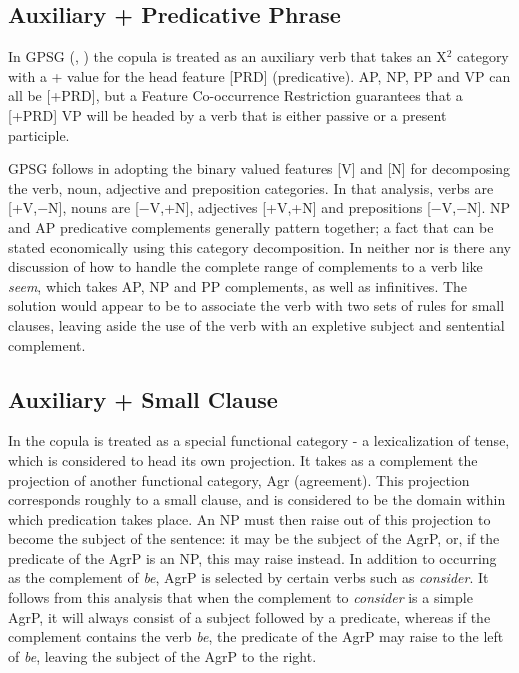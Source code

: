 \subsection{Auxiliary + Predicative Phrase}
\label{gpsg}

In GPSG (\cite{gazdar85}, \cite{sag85}) the copula is treated as an auxiliary
verb that takes an X$^{2}$ category with a + value for the head feature
[PRD] (predicative). AP, NP, PP and VP can all be [+PRD], but a
Feature Co-occurrence Restriction guarantees that a [+PRD] VP will be
headed by a verb that is either passive or a present participle.

GPSG follows \cite{chomsky70} in adopting the binary valued features [V] and
[N] for decomposing the verb, noun, adjective and preposition categories.  In
that analysis, verbs are [+V,$-$N], nouns are [$-$V,+N], adjectives [+V,+N] and
prepositions [$-$V,$-$N].  NP and AP predicative complements generally pattern
together; a fact that can be stated economically using this category
decomposition.  In neither \cite{sag85} nor \cite{chomsky70} is there any
discussion of how to handle the complete range of complements to a verb like
{\it seem}, which takes AP, NP and PP complements, as well as infinitives.  The
solution would appear to be to associate the verb with two sets of rules for
small clauses, leaving aside the use of the verb with an expletive subject and
sentential complement.

\subsection{Auxiliary + Small Clause}

\label{mo}
In \cite{moro90} the copula is treated as a special functional category - a
lexicalization of tense, which is considered to head its own projection. It
takes as a complement the projection of another functional category, Agr
(agreement). This projection corresponds roughly to a small clause, and is
considered to be the domain within which predication takes place.  An NP must
then raise out of this projection to become the subject of the sentence: it may
be the subject of the AgrP, or, if the predicate of the AgrP is an NP, this may
raise instead.  In addition to occurring as the complement of {\it be}, AgrP is
selected by certain verbs such as {\it consider}. It follows from this analysis
that when the complement to {\it consider} is a simple AgrP, it will always
consist of a subject followed by a predicate, whereas if the complement
contains the verb {\it be}, the predicate of the AgrP may raise to the left of
{\it be}, leaving the subject of the AgrP to the right.

